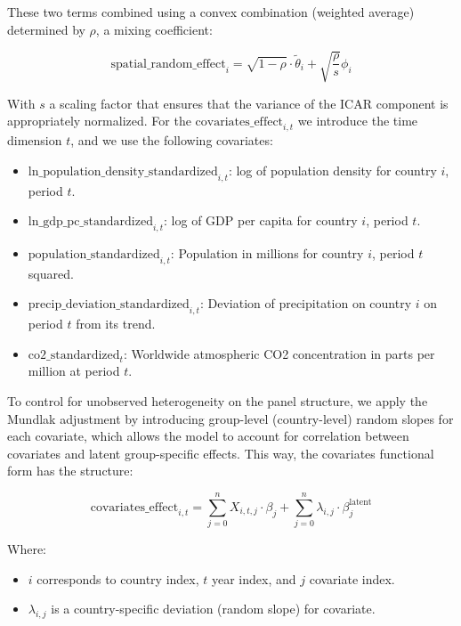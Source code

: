These two terms combined using a convex combination (weighted average) determined by $\rho$, a mixing coefficient:

\begin{equation}
\text{spatial\_random\_effect}_{i} = \sqrt{1-\rho} \cdot \tilde{\theta}_i + \sqrt{\frac{\rho}{s}} \phi_i
\end{equation}

With $s$ a scaling factor that ensures that the variance of the ICAR component is appropriately normalized. For the $\text{covariates\_effect}_{i,t}$ we introduce the time dimension $t$, and we use the following covariates:

\begin{itemize}
    \item $\text{ln\_population\_density\_standardized}_{i,t}$: log of population density for country $i$, period $t$.
    \item $\text{ln\_gdp\_pc\_standardized}_{i,t}$: log of GDP per capita for country $i$, period $t$.
    \item $\text{population\_standardized}_{i,t}$: Population in millions for country $i$, period $t$ squared.
    \item $\text{precip\_deviation\_standardized}_{i,t}$: Deviation of precipitation on country $i$ on period $t$ from its trend.
    \item $\text{co2\_standardized}_{t}$: Worldwide atmospheric CO2 concentration in parts per million at period $t$.
\end{itemize}

To control for unobserved heterogeneity on the panel structure, we apply the Mundlak adjustment by introducing group-level (country-level) random slopes for each covariate, which allows the model to account for correlation between covariates and latent group-specific effects. This way, the covariates functional form has the structure:

\begin{equation}
\text{covariates\_effect}_{i,t} = \sum_{j=0}^{n} X_{i,t,j} \cdot \beta_j + \sum_{j=0}^{n} \lambda_{i,j} \cdot \beta_j^{\text{latent}}
\end{equation}

Where:
\begin{itemize}
    \item $i$ corresponds to country index, $t$ year index, and $j$ covariate index.
    \item $\lambda_{i,j}$ is a country-specific deviation (random slope) for covariate.
\end{itemize}

